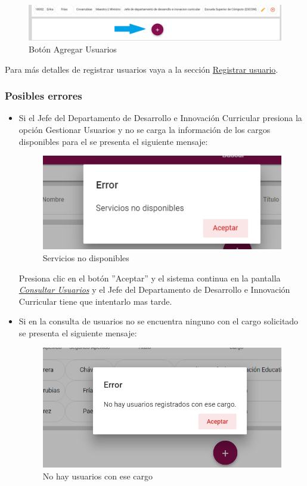 \begin{figure}[H]
	\centering
	\hypertarget{add}{\includegraphics[width=0.7\linewidth]{images/SP5/BtnAgregar}}
	\caption{Botón Agregar Usuarios}
	\label{add}
\end{figure}

Para más detalles de registrar usuarios vaya a la sección \hyperlink{registrar-Us}{Registrar usuario}.

\subsubsection{Posibles errores}
\begin{itemize}
	\item Si el Jefe del Departamento de Desarrollo e Innovación Curricular  presiona la opción Gestionar Usuarios y no se carga la información de los cargos disponibles para el se presenta el siguiente mensaje:
	
	\begin{figure}[H]
		\centering
		\includegraphics[width=0.4\linewidth]{images/SP5/MSGSN}
		\caption{Servicios no disponibles}
		\label{SND}
		
	\end{figure}
	
	Presiona clic en el botón ''Aceptar'' y  el sistema continua en la pantalla  \hyperlink{consultarUs}{\textit{Consultar Usuarios}} y el Jefe del Departamento de Desarrollo e Innovación Curricular tiene que intentarlo  mas tarde.
	
	\item Si en la consulta de usuarios no se encuentra ninguno con el cargo solicitado se presenta el siguiente mensaje:
	\begin{figure}[H]
		\centering
		\includegraphics[width=0.4\linewidth]{images/SP5/MSG21}
		\caption{No hay usuarios con ese cargo}
		\label{mensaje21}
	\end{figure}
	
\end{itemize}

